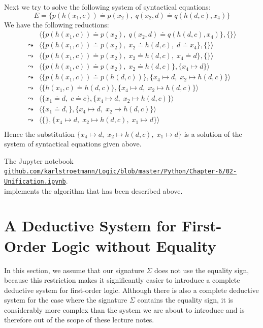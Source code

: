 \exampleEng
Next we try to solve the following system of syntactical equations: 
\[ E = \big\{ p(h(x_1,c)) \doteq p(x_2),\; q(x_2, d) \doteq q(h(d,c),x_4) \big\} \]
We have the following reductions:
$$
\begin{array}{ll}
          & \big\langle \big\{ p(h(x_1,c)) \doteq p(x_2),\; q(x_2, d) \doteq q(h(d,c),x_4) \big\}, \{ \} \big\rangle \\[0.2cm]
 \leadsto & \big\langle \big\{ p(h(x_1,c)) \doteq p(x_2),\; x_2 \doteq h(d,c), \; d \doteq x_4 \big\}, \{ \} \big\rangle \\[0.2cm]
 \leadsto & \big\langle \big\{ p(h(x_1,c)) \doteq p(x_2),\; x_2 \doteq h(d,c), \; x_4 \doteq d \big\}, \{ \} \big\rangle \\[0.2cm]
 \leadsto & \big\langle \big\{ p(h(x_1,c)) \doteq p(x_2),\; x_2 \doteq h(d,c) \big\}, \{ x_4 \mapsto d \} \big\rangle \\[0.2cm]
 \leadsto & \big\langle \big\{ p(h(x_1,c)) \doteq p(h(d,c)) \big\}, \{ x_4 \mapsto d,\; x_2 \mapsto h(d,c) \} \big\rangle \\[0.2cm]
 \leadsto & \big\langle \big\{ h(x_1,c) \doteq h(d,c) \big\}, \{ x_4 \mapsto d,\; x_2 \mapsto h(d,c) \} \big\rangle \\[0.2cm]
 \leadsto & \big\langle \big\{ x_1 \doteq d,\; c \doteq c \big\}, \{ x_4 \mapsto d,\; x_2 \mapsto h(d,c) \} \big\rangle \\[0.2cm]
 \leadsto & \big\langle \big\{ x_1 \doteq d,\big\}, \{ x_4 \mapsto d,\; x_2 \mapsto h(d,c) \} \big\rangle \\[0.2cm]
 \leadsto & \big\langle \big\{\big\}, \{ x_4 \mapsto d,\; x_2 \mapsto h(d,c),\; x_1 \mapsto d \} \big\rangle \\[0.2cm]
\end{array}
$$
Hence the  substitution  $\{ x_4 \mapsto d,\; x_2 \mapsto h(d,c),\; x_1 \mapsto d \}$ is a solution
of the system of syntactical equations given above.
\eox


\noindent
The Jupyter notebook
\\[0.2cm]
\href{https://github.com/karlstroetmann/Logic/blob/master/Python/Chapter-6/02-Unification.ipynb}{\small\texttt{github.com/karlstroetmann/Logic/blob/master/Python/Chapter-6/02-Unification.ipynb}}.
\\[0.2cm]
implements the algorithm that has been described above.

\section{A Deductive System for First-Order Logic without Equality \label{sec:fol-calculus}}
In this section, we assume that our signature $\Sigma$ does not use the equality sign, because this restriction
makes it significantly easier to introduce a complete deductive system for first-order logic. Although there is
also a complete deductive system for the case where the signature $\Sigma$ contains the equality sign, it is
considerably more complex than the system we are about to introduce and is therefore out of the scope of these
lecture notes. 

